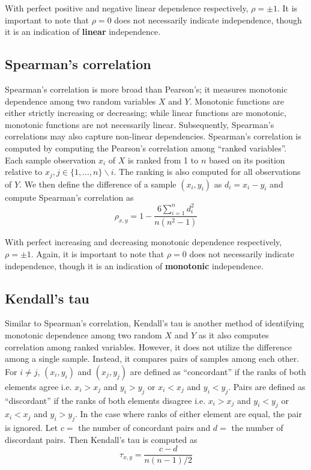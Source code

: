 With perfect positive and negative linear dependence respectively, $\rho=\pm1$. It is important to note that $\rho=0$ does not necessarily indicate independence, though it is an indication of \textbf{linear} independence.

\subsection{Spearman's correlation}

Spearman's correlation is more broad than Pearson's; it measures monotonic dependence among two random variables $X$ and $Y$. Monotonic functions are either strictly increasing or decreasing; while linear functions are monotonic, monotonic functions are not necessarily linear. Subsequently, Spearman's correlations may also capture non-linear dependencies. Spearman's correlation is computed by computing the Pearson's correlation among ``ranked variables''. Each sample observation $x_i$ of $X$ is ranked from 1 to $n$ based on its position relative to $x_j, j\in\{1,...,n\}\backslash{i}$. The ranking is also computed for all observations of $Y$. We then define the difference of a sample $(x_i,y_i)$ as $d_i=x_i-y_i$ and compute Spearman's correlation as
$$\rho_{x,y}=1-\frac{6 \sum\limits_{i=1}^{n}d_i^2}{n(n^2-1)}$$

With perfect increasing and decreasing monotonic dependence respectively, $\rho=\pm1$. Again, it is important to note that $\rho=0$ does not necessarily indicate independence, though it is an indication of \textbf{monotonic} independence.

\subsection{Kendall's tau}

Similar to Spearman's correlation, Kendall's tau is another method of identifying monotonic dependence among two random $X$ and $Y$ as it also computes correlation among ranked variables. However, it does not utilize the difference among a single sample. Instead, it compares pairs of samples among each other. For $i\not=j$, $(x_i,y_i)$ and $(x_j,y_j)$ are defined as ``concordant'' if the ranks of both elements agree i.e. $x_i > x_j$ and $y_i > y_j$ or $x_i < x_j$ and $y_i < y_j$. Pairs are defined as ``discordant'' if the ranks of both elements disagree i.e. $x_i > x_j$ and $y_i < y_j$ or $x_i < x_j$ and $y_i > y_j$. In the case where ranks of either element are equal, the pair is ignored. Let $c=$ the number of concordant pairs and $d=$ the number of discordant pairs. Then Kendall's tau is computed as 
$$\tau_{x,y}=\frac{c-d}{n(n-1)/2}$$

